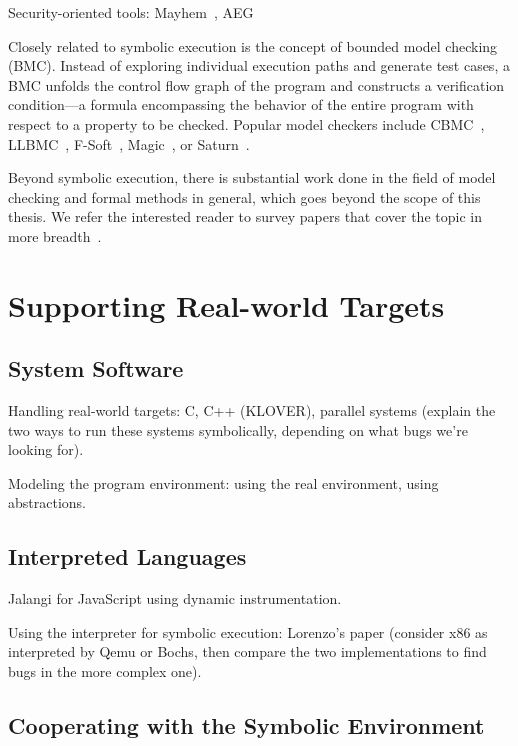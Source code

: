 Security-oriented tools: Mayhem~\cite{mayhem}, AEG~\cite{aeg}

Closely related to symbolic execution is the concept of bounded model checking (BMC).  Instead of exploring individual execution paths and generate test cases, a BMC unfolds the control flow graph of the program and constructs a verification condition---a formula encompassing the behavior of the entire program with respect to a property to be checked.  Popular model checkers include CBMC~\cite{cbmc}, LLBMC~\cite{llbmc2012}, F-Soft~\cite{f-soft}, Magic~\cite{magic}, or Saturn~\cite{saturn}.

Beyond symbolic execution, there is substantial work done in the field of model checking and formal methods in general, which goes beyond the scope of this thesis.  We refer the interested reader to survey papers that cover the topic in more breadth~\cite{jhala2009software, woodcock2009formal}.


\section{Supporting Real-world Targets}
\label{sec:relwork:targets}

\subsection{System Software}

Handling real-world targets: C, C++ (KLOVER), parallel systems (explain the two ways to run these systems symbolically, depending on what bugs we're looking for).

Modeling the program environment: using the real environment, using abstractions.

\subsection{Interpreted Languages}

Jalangi for JavaScript using dynamic instrumentation.

Using the interpreter for symbolic execution: Lorenzo's paper (consider x86 as interpreted by Qemu or Bochs, then compare the two implementations to find bugs in the more complex one).

\subsection{Cooperating with the Symbolic Environment}

